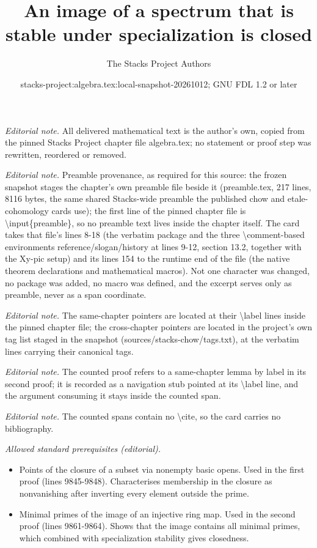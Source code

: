 \documentclass[10pt,a4paper]{amsart}
\title{An image of a spectrum that is stable under specialization is closed}
\author{The Stacks Project Authors}
\date{stacks-project:algebra.tex:local-snapshot-20261012; GNU FDL 1.2 or later}
\theoremstyle{plain}
\theoremstyle{definition}
\theoremstyle{remark}
\numberwithin{equation}{subsection}
\begin{document}
\maketitle
\noindent\textit{Editorial note.} All delivered mathematical text is the author's own, copied from the pinned Stacks Project chapter file algebra.tex; no statement or proof step was rewritten, reordered or removed.\par\medskip
\noindent\textit{Editorial note.} Preamble provenance, as required for this source: the frozen snapshot stages the chapter's own preamble file beside it (preamble.tex, 217 lines, 8116 bytes, the same shared Stacks-wide preamble the published chow and etale-cohomology cards use); the first line of the pinned chapter file is \textbackslash{}input\{preamble\}, so no preamble text lives inside the chapter itself. The card takes that file's lines 8-18 (the verbatim package and the three \textbackslash{}comment-based environments reference/slogan/history at lines 9-12, section 13.2, together with the Xy-pic setup) and its lines 154 to the runtime end of the file (the native theorem declarations and mathematical macros). Not one character was changed, no package was added, no macro was defined, and the excerpt serves only as preamble, never as a span coordinate.\par\medskip
\noindent\textit{Editorial note.} The same-chapter pointers are located at their \textbackslash{}label lines inside the pinned chapter file; the cross-chapter pointers are located in the project's own tag list staged in the snapshot (sources/stacks-chow/tags.txt), at the verbatim lines carrying their canonical tags.\par\medskip
\noindent\textit{Editorial note.} The counted proof refers to a same-chapter lemma by label in its second proof; it is recorded as a navigation stub pointed at its \textbackslash{}label line, and the argument consuming it stays inside the counted span.\par\medskip
\noindent\textit{Editorial note.} The counted spans contain no \textbackslash{}cite, so the card carries no bibliography.\par\medskip
\noindent\textit{Allowed standard prerequisites (editorial).}\begin{itemize}
\item Points of the closure of a subset via nonempty basic opens. Used in the first proof (lines 9845-9848). Characterises membership in the closure as nonvanishing after inverting every element outside the prime.
\item Minimal primes of the image of an injective ring map. Used in the second proof (lines 9861-9864). Shows that the image contains all minimal primes, which combined with specialization stability gives closedness.
\end{itemize}\medskip
\end{document}
